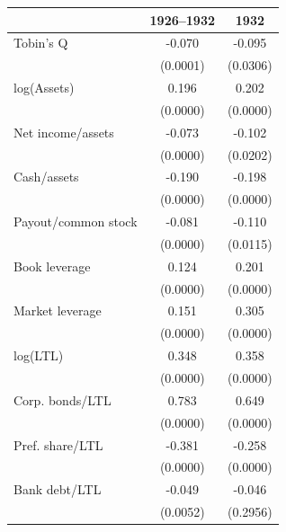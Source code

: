 \begin{threeparttable}
\begin{tabular}{lcc}
\toprule
 & 1926--1932 & 1932 \\
\midrule
Tobin's Q & -0.070 & -0.095 \\
 & (0.0001) & (0.0306) \\
log(Assets) &  0.196 &  0.202 \\
 & (0.0000) & (0.0000) \\
Net income/assets & -0.073 & -0.102 \\
 & (0.0000) & (0.0202) \\
Cash/assets & -0.190 & -0.198 \\
 & (0.0000) & (0.0000) \\
Payout/common stock & -0.081 & -0.110 \\
 & (0.0000) & (0.0115) \\
Book leverage &  0.124 &  0.201 \\
 & (0.0000) & (0.0000) \\
Market leverage &  0.151 &  0.305 \\
 & (0.0000) & (0.0000) \\
log(LTL) &  0.348 &  0.358 \\
 & (0.0000) & (0.0000) \\
Corp. bonds/LTL &  0.783 &  0.649 \\
 & (0.0000) & (0.0000) \\
Pref. share/LTL & -0.381 & -0.258 \\
 & (0.0000) & (0.0000) \\
Bank debt/LTL & -0.049 & -0.046 \\
 & (0.0052) & (0.2956) \\
\bottomrule
\end{tabular}\end{threeparttable}
